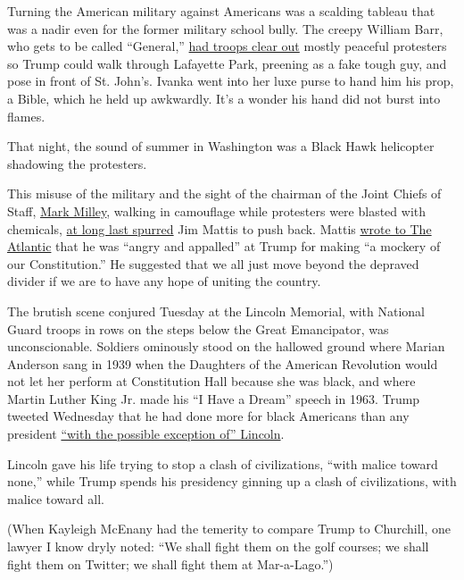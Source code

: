 Turning the American military against Americans was a scalding tableau
that was a nadir even for the former military school bully. The creepy
William Barr, who gets to be called ``General,''
\href{https://www.nytimes3xbfgragh.onion/2020/06/02/us/politics/trump-walk-lafayette-square.html}{had
troops clear out} mostly peaceful protesters so Trump could walk through
Lafayette Park, preening as a fake tough guy, and pose in front of St.
John's. Ivanka went into her luxe purse to hand him his prop, a Bible,
which he held up awkwardly. It's a wonder his hand did not burst into
flames.

That night, the sound of summer in Washington was a Black Hawk
helicopter shadowing the protesters.

This misuse of the military and the sight of the chairman of the Joint
Chiefs of Staff,
\href{https://www.nytimes3xbfgragh.onion/2020/06/05/us/politics/protests-milley-trump.html}{Mark
Milley}, walking in camouflage while protesters were blasted with
chemicals,
\href{https://www.washingtonpost.com/politics/how-mattis-reached-his-breaking-point--and-decided-to-speak-out-against-trump/2020/06/05/6aafd548-a69e-11ea-bb20-ebf0921f3bbd_story.html}{at
long last spurred} Jim Mattis to push back. Mattis
\href{https://www.theatlantic.com/politics/archive/2020/06/james-mattis-denounces-trump-protests-militarization/612640/}{wrote
to The Atlantic} that he was ``angry and appalled'' at Trump for making
``a mockery of our Constitution.'' He suggested that we all just move
beyond the depraved divider if we are to have any hope of uniting the
country.

The brutish scene conjured Tuesday at the Lincoln Memorial, with
National Guard troops in rows on the steps below the Great Emancipator,
was unconscionable. Soldiers ominously stood on the hallowed ground
where Marian Anderson sang in 1939 when the Daughters of the American
Revolution would not let her perform at Constitution Hall because she
was black, and where Martin Luther King Jr. made his ``I Have a Dream''
speech in 1963. Trump tweeted Wednesday that he had done more for black
Americans than any president
\href{https://twitter.com/realDonaldTrump/status/1268167411230007300}{``with
the possible exception of'' Lincoln}.

Lincoln gave his life trying to stop a clash of civilizations, ``with
malice toward none,'' while Trump spends his presidency ginning up a
clash of civilizations, with malice toward all.

(When Kayleigh McEnany had the temerity to compare Trump to Churchill,
one lawyer I know dryly noted: ``We shall fight them on the golf
courses; we shall fight them on Twitter; we shall fight them at
Mar-a-Lago.'')

